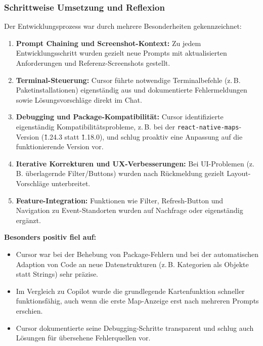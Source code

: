 \subsubsection{Schrittweise Umsetzung und Reflexion}

Der Entwicklungsprozess war durch mehrere Besonderheiten gekennzeichnet:

\begin{enumerate}
      \item \textbf{Prompt Chaining und Screenshot-Kontext:} Zu jedem Entwicklungsschritt wurden gezielt neue Prompts mit aktualisierten Anforderungen und Referenz-Screenshots gestellt.
      \item \textbf{Terminal-Steuerung:} Cursor führte notwendige Terminalbefehle (z.\,B. Paketinstallationen) eigenständig aus und dokumentierte Fehlermeldungen sowie Lösungsvorschläge direkt im Chat.
      \item \textbf{Debugging und Package-Kompatibilität:} Cursor identifizierte eigenständig Kompatibilitätsprobleme, z.\,B. bei der \texttt{react-native-maps}-Version (\^1.24.3 statt \^1.18.0), und schlug proaktiv eine Anpassung auf die funktionierende Version vor.
      \item \textbf{Iterative Korrekturen und UX-Verbesserungen:} Bei UI-Problemen (z.\,B. überlagernde Filter/Buttons) wurden nach Rückmeldung gezielt Layout-Vorschläge unterbreitet.
      \item \textbf{Feature-Integration:} Funktionen wie Filter, Refresh-Button und Navigation zu Event-Standorten wurden auf Nachfrage oder eigenständig ergänzt.
\end{enumerate}

\textbf{Besonders positiv fiel auf:}
\begin{itemize}
      \item Cursor war bei der Behebung von Package-Fehlern und bei der automatischen
            Adaption von Code an neue Datenstrukturen (z.\,B. Kategorien als Objekte statt
            Strings) sehr präzise.
      \item Im Vergleich zu Copilot wurde die grundlegende Kartenfunktion schneller
            funktionsfähig, auch wenn die erste Map-Anzeige erst nach mehreren Prompts
            erschien.
      \item Cursor dokumentierte seine Debugging-Schritte transparent und schlug auch
            Lösungen für übersehene Fehlerquellen vor.
\end{itemize}

